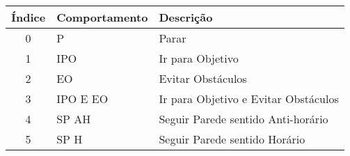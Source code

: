 \begin{table}[ht]
\centering
\vspace{0.2 cm}
\begin{tabular}{|c|l|l|}
\hline
\textbf{Índice} & \textbf{Comportamento} & \textbf{Descrição}                                         \\ \hline
0      & P             & Parar                                             \\ \hline
1      & IPO           & Ir para Objetivo                                  \\ \hline
2      & EO            & Evitar Obstáculos                                 \\ \hline
3      & IPO E EO    & Ir para Objetivo e Evitar Obstáculos \\ \hline
4      & SP AH         & Seguir Parede sentido Anti-horário				   \\ \hline
5      & SP H          & Seguir Parede sentido Horário                     \\ \hline
\end{tabular}
\end{table}
